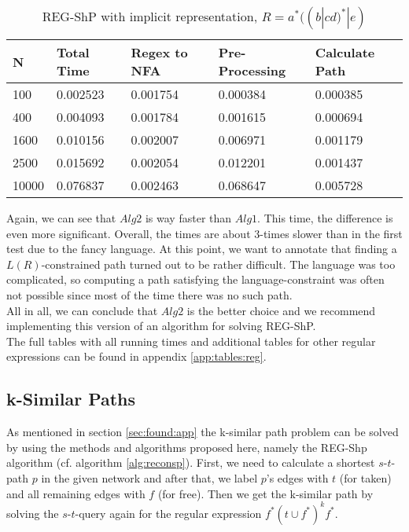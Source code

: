 \documentclass[]{article}
\numberwithin{equation}{section}
\begin{document}
\begin{table}[H]
	\centering
	\begin{tabular}{|l|l|l|l|l|}
		\hline
		N     & Total Time & Regex to NFA & Pre-Processing & Calculate Path \\ \hline
		100   & 0.002523   & 0.001754     & 0.000384       & 0.000385       \\ \hline
		400   & 0.004093   & 0.001784     & 0.001615       & 0.000694       \\ \hline
		1600  & 0.010156   & 0.002007     & 0.006971       & 0.001179       \\ \hline
		2500  & 0.015692   & 0.002054     & 0.012201       & 0.001437       \\ \hline
		10000 & 0.076837   & 0.002463     & 0.068647       & 0.005728       \\ \hline
	\end{tabular}
	\caption{REG-ShP with implicit representation, $R = a^*((b|cd)^*|e)$}
	\label{table:regshp2}
\end{table}

Again, we can see that $Alg2$ is way faster than $Alg1$. This time, the difference is even more significant. Overall, the times are about $3$-times slower than in the first test due to the fancy language. At this point, we want to annotate that finding a $L(R)$-constrained path turned out to be rather difficult. The language was too complicated, so computing a path satisfying the language-constraint was often not possible since most of the time there was no such path.\\

All in all, we can conclude that $Alg2$ is the better choice and we recommend implementing this version of an algorithm for solving REG-ShP.\\

The full tables with all running times and additional tables for other regular expressions can be found in appendix \ref{app:tables:reg}.

\subsection{k-Similar Paths}
\label{sec:study:ksim}

As mentioned in section \ref{sec:found:app} the k-similar path problem can be solved by using the methods and algorithms proposed here, namely the REG-Shp algorithm (cf. algorithm \ref{alg:reconsp}). First, we need to calculate a shortest $s$-$t$-path $p$ in the given network and after that, we label $p$’s edges with $t$ (for taken) and all remaining edges with $f$ (for free). Then we get the k-similar path by solving the $s$-$t$-query again for the regular expression $f^*(t \cup f^*)^kf^*$.\\
\end{document}
